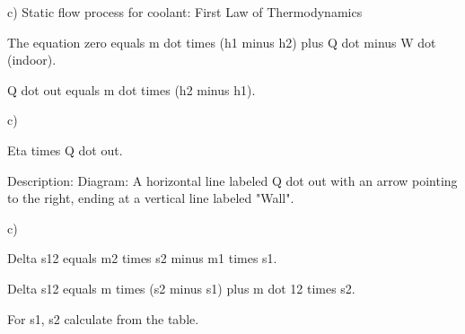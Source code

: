 c) Static flow process for coolant: First Law of Thermodynamics

The equation zero equals m dot times (h1 minus h2) plus Q dot minus W dot (indoor).

Q dot out equals m dot times (h2 minus h1).

c)

Eta times Q dot out.

Description:
Diagram: A horizontal line labeled Q dot out with an arrow pointing to the right, ending at a vertical line labeled "Wall".

c)

Delta s12 equals m2 times s2 minus m1 times s1.

Delta s12 equals m times (s2 minus s1) plus m dot 12 times s2.

For s1, s2 calculate from the table.